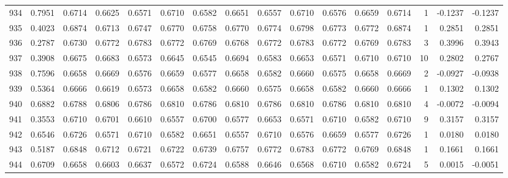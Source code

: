 \begin{tabular}{lrrrrrrrrrrrrrrr}
934 &      0.7951 &  0.6714 &  0.6625 &  0.6571 &  0.6710 &  0.6582 &  0.6651 &  0.6557 &  0.6710 &  0.6576 &   0.6659 &     0.6714 &      1 &                   -0.1237 &                    -0.1237 \\
935 &      0.4023 &  0.6874 &  0.6713 &  0.6747 &  0.6770 &  0.6758 &  0.6770 &  0.6774 &  0.6798 &  0.6773 &   0.6772 &     0.6874 &      1 &                    0.2851 &                     0.2851 \\
936 &      0.2787 &  0.6730 &  0.6772 &  0.6783 &  0.6772 &  0.6769 &  0.6768 &  0.6772 &  0.6783 &  0.6772 &   0.6769 &     0.6783 &      3 &                    0.3996 &                     0.3943 \\
937 &      0.3908 &  0.6675 &  0.6683 &  0.6573 &  0.6645 &  0.6545 &  0.6694 &  0.6583 &  0.6653 &  0.6571 &   0.6710 &     0.6710 &     10 &                    0.2802 &                     0.2767 \\
938 &      0.7596 &  0.6658 &  0.6669 &  0.6576 &  0.6659 &  0.6577 &  0.6658 &  0.6582 &  0.6660 &  0.6575 &   0.6658 &     0.6669 &      2 &                   -0.0927 &                    -0.0938 \\
939 &      0.5364 &  0.6666 &  0.6619 &  0.6573 &  0.6658 &  0.6582 &  0.6660 &  0.6575 &  0.6658 &  0.6582 &   0.6660 &     0.6666 &      1 &                    0.1302 &                     0.1302 \\
940 &      0.6882 &  0.6788 &  0.6806 &  0.6786 &  0.6810 &  0.6786 &  0.6810 &  0.6786 &  0.6810 &  0.6786 &   0.6810 &     0.6810 &      4 &                   -0.0072 &                    -0.0094 \\
941 &      0.3553 &  0.6710 &  0.6701 &  0.6610 &  0.6557 &  0.6700 &  0.6577 &  0.6653 &  0.6571 &  0.6710 &   0.6582 &     0.6710 &      9 &                    0.3157 &                     0.3157 \\
942 &      0.6546 &  0.6726 &  0.6571 &  0.6710 &  0.6582 &  0.6651 &  0.6557 &  0.6710 &  0.6576 &  0.6659 &   0.6577 &     0.6726 &      1 &                    0.0180 &                     0.0180 \\
943 &      0.5187 &  0.6848 &  0.6712 &  0.6721 &  0.6722 &  0.6739 &  0.6757 &  0.6772 &  0.6783 &  0.6772 &   0.6769 &     0.6848 &      1 &                    0.1661 &                     0.1661 \\
944 &      0.6709 &  0.6658 &  0.6603 &  0.6637 &  0.6572 &  0.6724 &  0.6588 &  0.6646 &  0.6568 &  0.6710 &   0.6582 &     0.6724 &      5 &                    0.0015 &                    -0.0051 \\

\end{tabular}
